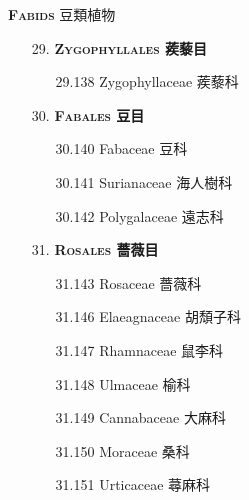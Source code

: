 \vspace{2ex} 
\noindent \normalsize\textsc{\textbf{Fabids} 豆類植物}\selectfont \\
\footnotesize\selectfont
\begin{enumerate}
  \item[29. ] \textbf{\textsc{Zygophyllales} 蒺藜目}   
    \begin{enumerate}
      \item[29.138] Zygophyllaceae 蒺藜科     
        
    \end{enumerate}
  \item[30. ] \textbf{\textsc{Fabales} 豆目}   
    \begin{enumerate}
      \item[30.140] Fabaceae 豆科     
        
      \item[30.141] Surianaceae 海人樹科     
        
      \item[30.142] Polygalaceae 遠志科     
        
    \end{enumerate}
  \item[31. ] \textbf{\textsc{Rosales} 薔薇目}   
    \begin{enumerate}
      \item[31.143] Rosaceae 薔薇科     
        
      \item[31.146] Elaeagnaceae 胡頹子科     
        
      \item[31.147] Rhamnaceae 鼠李科     
        
      \item[31.148] Ulmaceae 榆科     
        
      \item[31.149] Cannabaceae 大麻科     
        
      \item[31.150] Moraceae 桑科     
        
      \item[31.151] Urticaceae 蕁麻科     
        

\end{enumerate}
\end{enumerate}
